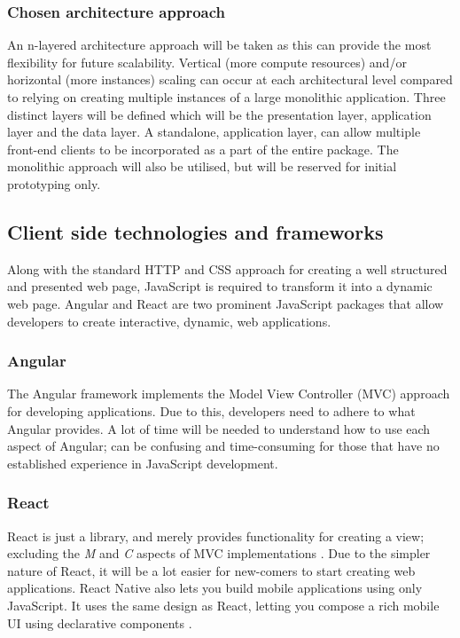 \subsubsection*{Chosen architecture approach}
An n-layered architecture approach will be taken as this can provide the most flexibility for future scalability.
Vertical (more compute resources) and/or horizontal (more instances) scaling can occur at each architectural level compared to relying on
creating multiple instances of a large monolithic application.
Three distinct layers will be defined which will be the presentation layer, application layer and the data layer.
A standalone, application layer, can allow multiple front-end clients to be incorporated as a part of the entire package.
The monolithic approach will also be utilised, but will be reserved for initial prototyping only.

\subsection{Client side technologies and frameworks}

Along with the standard HTTP and CSS approach for creating a well structured and presented web page, JavaScript is required to
transform it into a dynamic web page.
Angular and React are two prominent JavaScript packages that allow developers to create interactive, dynamic, web applications.

\subsubsection*{Angular}
The Angular framework implements the Model View Controller (MVC) approach for developing applications.
Due to this, developers need to adhere to what Angular provides. 
A lot of time will be needed to understand how to use each aspect of Angular; can be confusing and time-consuming for those that
have no established experience in JavaScript development.

\subsubsection*{React}
React is just a library, and merely provides functionality for creating a view; excluding the \textit{M} and \textit{C} aspects of
MVC implementations \cite{mosh2018reactvangular}.
Due to the simpler nature of React, it will be a lot easier for new-comers to start creating web applications.
React Native also lets you build mobile applications using only JavaScript.
It uses the same design as React, letting you compose a rich mobile UI using declarative components \cite{facebook2019reactnative}.

